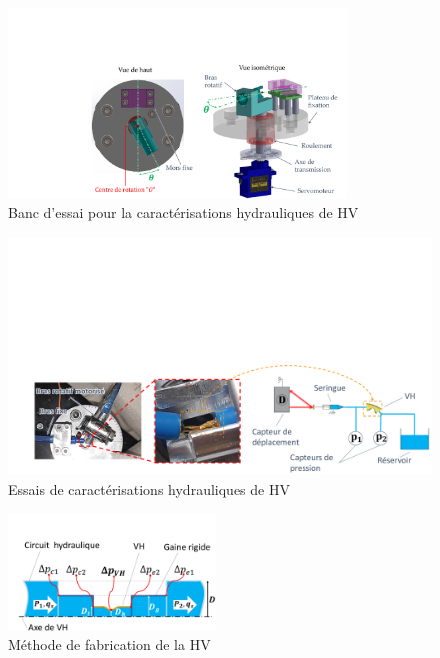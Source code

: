 \documentclass[3p,twocolumn,preprint]{elsarticle}
\begin{document}
\begin{figure}[!htb]
\begin{center}
	\captionsetup{justification=centering} 
	\includegraphics[trim={8cm 0cm 0cm 5cm},clip,width=0.8\textwidth]{figures/BDT_hydraulique_VH.pdf}
	\caption{Banc d'essai pour la caractérisations hydrauliques de HV}
	\label{fig:BDT_hydraulique_VH}
\end{center}	
\end{figure}    
\begin{figure}[!htb]
\begin{center}
	\captionsetup{justification=centering} 
	\includegraphics[trim={2cm 0cm 0cm 10cm},clip,width=\textwidth]{figures/essais_hydraulique_VH.pdf}
	\caption{Essais de caractérisations hydrauliques de HV}
	\label{fig:essais_hydraulique_VH}
\end{center}	
\end{figure}    
\begin{figure}[!htb]
\begin{center}
	\captionsetup{justification=centering} 
	\includegraphics[trim={2cm 0cm 0cm 4cm},clip,width=0.49\textwidth]{figures/fabrication_tube_experimental.pdf}
	\caption{Méthode de fabrication de la HV}
	\label{fig:fabrication_tube_experimental}
\end{center}	
\end{figure}    
\end{document}
